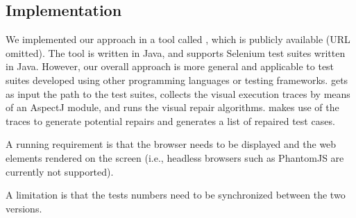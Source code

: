 \subsection{Implementation}\label{sec:implementation}

We implemented our approach in a tool called \tool, which is publicly available (URL omitted). 
The tool is written in Java, and supports Selenium test suites written in Java. However, our overall approach is more general and applicable to test suites developed using other programming languages or testing frameworks. 
\tool gets as input the path to the test suites, collects the visual execution traces by means of an AspectJ module, and runs the visual repair algorithms. 
\tool makes use of the traces to generate potential repairs and generates a list of repaired test cases.


A running requirement is that the browser needs to be displayed and the web elements rendered on the screen (i.e., headless browsers such as PhantomJS are currently not supported).

A limitation is that the tests numbers need to be synchronized between the two versions. 







